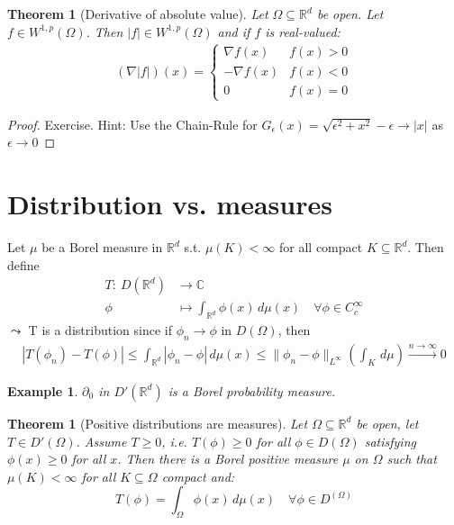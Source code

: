 \documentclass{report}
\theoremstyle{tommy}
\newtheorem{thm}[defn]{Theorem}
\newtheorem{eg}[defn]{Example}
\begin{document}
  \begin{thm}[Derivative of absolute value] Let \(\Omega \subseteq \mathbb{R}^d\) be open. Let \(f \in W^{1,p}(\Omega)\). 
    Then \(|f| \in W^{1,p}(\Omega)\)
    and  if \(f\) is real-valued:
    \begin{align*}
      (\nabla |f|) (x) =
      \begin{cases}
        \nabla f(x) & f(x) > 0 \\
        -\nabla f(x) & f(x) < 0 \\
        0 & f(x) = 0
      \end{cases}
    \end{align*}
  \end{thm}

  \begin{proof}
    Exercise. Hint: Use the Chain-Rule for \(G_\epsilon(x) = \sqrt{\epsilon^2 + x^2} - \epsilon \to |x|\) as  \(\epsilon \to 0\)
  \end{proof}

  \section{Distribution vs. measures}
  Let \(\mu\) be a Borel measure in \(\mathbb{R}^d\) s.t. \(\mu(K) < \infty\) for all compact \(K \subseteq \mathbb{R}^d\). Then define 
  \begin{align*}
    T: \ D(\mathbb{R}^d) &\longrightarrow \mathbb{C} \\
    \phi &\longmapsto \int_{\mathbb{R}^d} \phi(x) \, d\mu(x) \quad \forall \phi \in C_c^\infty
  \end{align*}
  \(\leadsto\) T is a distribution since if \(\phi_n \to \phi\) in \(D(\Omega)\), then
  \begin{align*}
    |T(\phi_n) - T(\phi)| 
    \le \int_{\mathbb{R}^d} |\phi_n - \phi| \, d\mu(x) \le \|\phi_n - \phi\|_{L^\infty} \left(\int_{K} \, d \mu \right) \xrightarrow{n \to \infty} 0
  \end{align*}
  
  \begin{eg}
    \(\partial_0\) in \(D'(\mathbb{R}^d)\) is a Borel probability measure.
  \end{eg}  
  
  \begin{thm}[Positive distributions are measures] 
    Let \(\Omega \subseteq \mathbb{R}^d\) be open, let \(T \in D'(\Omega)\). Assume \(T \ge 0\), i.e. \(T(\phi) \ge 0\) for all \(\phi \in D(\Omega)\) satisfying \(\phi(x) \ge 0\) for all \(x\). Then there is a Borel positive measure \(\mu\) on \(\Omega\) such that \(\mu(K) < \infty\) for all \(K \subseteq \Omega\) compact and:
    \[T(\phi) = \int_\Omega \phi(x) \, d\mu (x) \quad \forall \phi \in D^(\Omega)\]
  \end{thm}
\end{document}
